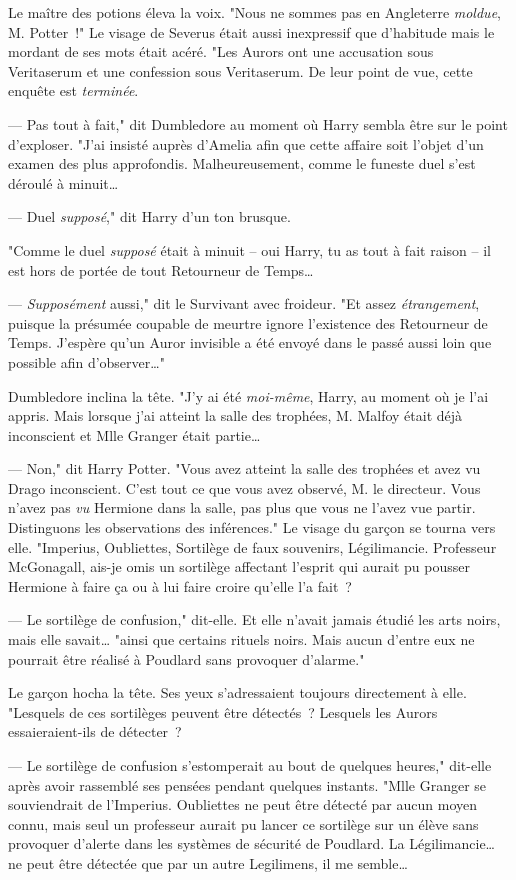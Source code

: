 Le maître des potions éleva la voix. "Nous ne sommes pas en Angleterre \emph{moldue}, M. Potter~!" Le visage de Severus était aussi inexpressif que d'habitude mais le mordant de ses mots était acéré. "Les Aurors ont une accusation sous Veritaserum et une confession sous Veritaserum. De leur point de vue, cette enquête est \emph{terminée}.

--- Pas tout à fait," dit Dumbledore au moment où Harry sembla être sur le point d'exploser. "J'ai insisté auprès d'Amelia afin que cette affaire soit l'objet d'un examen des plus approfondis. Malheureusement, comme le funeste duel s'est déroulé à minuit…

--- Duel \emph{supposé}," dit Harry d'un ton brusque.

"Comme le duel \emph{supposé} était à minuit -- oui Harry, tu as tout à fait raison -- il est hors de portée de tout Retourneur de Temps…

--- \emph{Supposément} aussi," dit le Survivant avec froideur. "Et assez \emph{étrangement}, puisque la présumée coupable de meurtre ignore l'existence des Retourneur de Temps. J'espère qu'un Auror invisible a été envoyé dans le passé aussi loin que possible afin d'observer…"

Dumbledore inclina la tête. "J'y ai été \emph{moi-même}, Harry, au moment où je l'ai appris. Mais lorsque j'ai atteint la salle des trophées, M. Malfoy était déjà inconscient et Mlle Granger était partie…

--- Non," dit Harry Potter. "Vous avez atteint la salle des trophées et avez vu Drago inconscient. C'est tout ce que vous avez observé, M. le directeur. Vous n'avez pas \emph{vu} Hermione dans la salle, pas plus que vous ne l'avez vue partir. Distinguons les observations des inférences." Le visage du garçon se tourna vers elle. "Imperius, Oubliettes, Sortilège de faux souvenirs, Légilimancie. Professeur McGonagall, ais-je omis un sortilège affectant l'esprit qui aurait pu pousser Hermione à faire ça ou à lui faire croire qu'elle l'a fait~?

--- Le sortilège de confusion," dit-elle. Et elle n'avait jamais étudié les arts noirs, mais elle savait… "ainsi que certains rituels noirs. Mais aucun d'entre eux ne pourrait être réalisé à Poudlard sans provoquer d'alarme."

Le garçon hocha la tête. Ses yeux s'adressaient toujours directement à elle. "Lesquels de ces sortilèges peuvent être détectés~? Lesquels les Aurors essaieraient-ils de détecter~?

--- Le sortilège de confusion s'estomperait au bout de quelques heures," dit-elle après avoir rassemblé ses pensées pendant quelques instants. "Mlle Granger se souviendrait de l'Imperius. Oubliettes ne peut être détecté par aucun moyen connu, mais seul un professeur aurait pu lancer ce sortilège sur un élève sans provoquer d'alerte dans les systèmes de sécurité de Poudlard. La Légilimancie… ne peut être détectée que par un autre Legilimens, il me semble…

